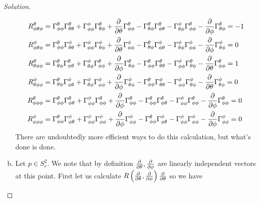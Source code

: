 \documentclass[a4paper]{article}
\begin{document}
\begin{proof}[Solution]
\begin{enumerate}[(a)]
\[\begin{aligned}
      R_{\phi \theta \phi}^\theta &= \Gamma_{\phi \phi}^\theta \Gamma_{\theta \theta}^\theta + \Gamma_{\phi \phi}^\phi \Gamma_{\theta \phi}^\theta + \pdv{\theta} \Gamma_{\phi \phi}^\theta - \Gamma_{\theta \phi}^\theta \Gamma_{\phi \theta}^\theta  - \Gamma_{\theta \phi}^\phi \Gamma_{\phi \phi}^\theta - \pdv{\phi} \Gamma_{\theta \phi}^\theta =  -1 \\
      R_{\phi \theta \phi}^\phi &= \Gamma_{\phi \phi}^\theta \Gamma_{\theta \theta}^\phi + \Gamma_{\phi \phi}^\phi \Gamma_{\theta \phi}^\phi + \pdv{\theta} \Gamma_{\phi \phi}^\phi - \Gamma_{\theta \phi}^\theta \Gamma_{\phi \theta}^\phi  - \Gamma_{\theta \phi}^\phi \Gamma_{\phi \phi}^\phi - \pdv{\phi} \Gamma_{\theta \phi}^\phi =  0 \\
      R_{\theta \phi \phi}^\theta &= \Gamma_{\theta \phi}^\theta \Gamma_{\phi \theta}^\theta + \Gamma_{\theta \phi}^\phi \Gamma_{\phi \phi}^\theta + \pdv{\phi} \Gamma_{\theta \phi}^\theta - \Gamma_{\phi \phi}^\theta \Gamma_{\theta \theta}^\theta  - \Gamma_{\phi \phi}^\phi \Gamma_{\theta \phi}^\theta - \pdv{\theta} \Gamma_{\phi \phi}^\theta =  1 \\
      R_{\theta \phi \phi}^\phi &= \Gamma_{\theta \phi}^\theta \Gamma_{\phi \theta}^\phi + \Gamma_{\theta \phi}^\phi \Gamma_{\phi \phi}^\phi + \pdv{\phi} \Gamma_{\theta \phi}^\phi - \Gamma_{\phi \phi}^\theta \Gamma_{\theta \theta}^\phi  - \Gamma_{\phi \phi}^\phi \Gamma_{\theta \phi}^\phi - \pdv{\theta} \Gamma_{\theta \phi}^\phi =  0 \\
      R_{\phi \phi \phi}^\theta &= \Gamma_{\phi \phi}^\theta \Gamma_{\phi \theta}^\theta + \Gamma_{\phi \phi}^\phi \Gamma_{\phi \phi}^\theta + \pdv{\phi} \Gamma_{\phi \phi}^\theta - \Gamma_{\phi \phi}^\theta \Gamma_{\phi \theta}^\theta  - \Gamma_{\phi \phi}^\phi \Gamma_{\phi \phi}^\theta - \pdv{\phi} \Gamma_{\phi \phi}^\theta =  0 \\
      R_{\phi \phi \phi}^\phi &= \Gamma_{\phi \phi}^\theta \Gamma_{\phi \theta}^\phi + \Gamma_{\phi \phi}^\phi \Gamma_{\phi \phi}^\phi + \pdv{\phi} \Gamma_{\phi \phi}^\phi - \Gamma_{\phi \phi}^\theta \Gamma_{\phi \theta}^\phi  - \Gamma_{\phi \phi}^\phi \Gamma_{\phi \phi}^\phi - \pdv{\phi} \Gamma_{\phi \phi}^\phi =  0 \\
    \end{aligned}
  \]
  There are undoubtedly more efficient ways to do this calculation, but what's done is done.
  \item Let $p \in S_r^2$. We note that by definition $\pdv{\theta}, \pdv{\phi}$ are linearly independent vectors at this point. First let us calculate $R \left(\pdv{\theta}, \pdv{\phi} \right)\pdv{\theta}$ so we have

\end{enumerate}
\end{proof}
\end{document}
